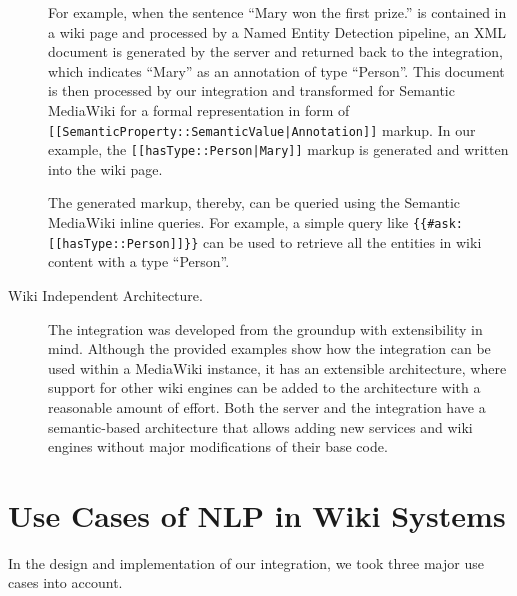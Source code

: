 \begin{description}
For example, when the sentence ``Mary won the first prize.'' is contained in a wiki page and processed by a Named Entity Detection pipeline, an XML document is generated by the \sa server and returned back to the \wikinlp integration, which indicates ``Mary'' as an annotation of type ``Person''. This document is then processed by our integration and transformed for Semantic MediaWiki for a formal representation in form of \texttt{[[SemanticProperty::SemanticValue|Annotation]]} markup. In our example, the \texttt{[[hasType::Person|Mary]]} markup is generated and written into the wiki page.

The generated markup, thereby, can be queried using the Semantic MediaWiki inline queries. For example, a simple query like \texttt{\{\{\#ask: [[hasType::Person]]\}\}} can be used to retrieve all the entities in wiki content with a type ``Person''.

\item[Wiki Independent Architecture.] The \wikinlp integration was developed from the groundup with extensibility in mind. Although the provided examples show how the \wikinlp integration can be used within a MediaWiki instance, it has an extensible architecture, where support for other wiki engines can be added to the architecture with a reasonable amount of effort. Both the \sa server and the \wikinlp integration have a semantic-based architecture that allows adding new services and wiki engines without major modifications of their base code.
\end{description}

\section{Use Cases of NLP in Wiki Systems}
In the design and implementation of our \wikinlp integration, we took three major use cases into account.

